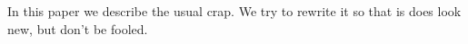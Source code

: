 In this paper we describe the usual crap. We try to rewrite it so that is does look new, but don't be fooled.

